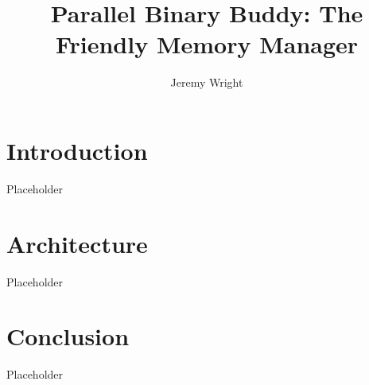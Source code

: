 \documentclass[12pt]{article}
\title{Parallel Binary Buddy: The Friendly Memory Manager}
\author{Jeremy Wright}
\begin{document}
\maketitle


\section{Introduction}
Placeholder \cite{Cisco}
\section{Architecture}
Placeholder

\section{Conclusion}
Placeholder



\end{document}
